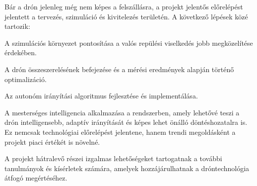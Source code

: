 Bár a drón jelenleg még nem képes a felszállásra, a projekt jelentős előrelépést jelentett a tervezés, szimuláció és kivitelezés területén. A következő lépések közé tartozik:

A szimulációs környezet pontosítása a valós repülési viselkedés jobb megközelítése érdekében.

A drón összeszerelésének befejezése és a mérési eredmények alapján történő optimalizáció.

Az autonóm irányítási algoritmus fejlesztése és implementálása.

A mesterséges intelligencia alkalmazása a rendszerben, amely lehetővé teszi a drón intelligensebb, adaptív irányítását és képes lehet önálló döntéshozatalra is. Ez nemcsak technológiai előrelépést jelentene, hanem trendi megoldásként a projekt piaci értékét is növelné.

A projekt hátralevő részei izgalmas lehetőségeket tartogatnak a további tanulmányok és kísérletek számára, amelyek hozzájárulhatnak a dróntechnológia átfogó megértéséhez.